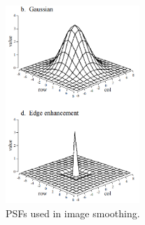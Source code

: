 \documentclass{article}
\begin{document}
\begin{figure}
\centering
\includegraphics[width=0.45\textwidth]{image_PSF.png}
\caption{\label{fig:1} PSFs used in image smoothing.}
\end{figure}
\end{document}
